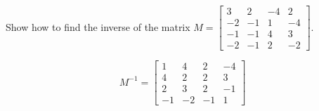 
\begin{exerciseStatement}


Show how to find the inverse of the matrix \(M= \left[\begin{array}{cccc}
3 & 2 & -4 & 2 \\
-2 & -1 & 1 & -4 \\
-1 & -1 & 4 & 3 \\
-2 & -1 & 2 & -2
\end{array}\right] \).


\end{exerciseStatement}
    
\begin{exerciseAnswer} 
\[M^{-1}= \left[\begin{array}{cccc}
1 & 4 & 2 & -4 \\
4 & 2 & 2 & 3 \\
2 & 3 & 2 & -1 \\
-1 & -2 & -1 & 1
\end{array}\right] \]
\end{exerciseAnswer}
    
